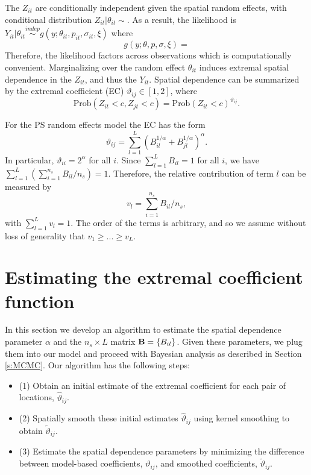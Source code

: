 \documentclass[12pt]{article}
\newcommand{\bB}{ \mbox{\bf B}}
\newcommand{\indep}{\stackrel{indep}{\sim}}
\newcommand{\beq}{ \begin{equation}}
\newcommand{\eeq}{ \end{equation}}
\begin{document}
The $Z_{it}$ are conditionally independent given the spatial random effects, with conditional distribution $Z_{it}|\theta_{it}\sim$.  As a result, the likelihood is $Y_{it}|\theta_{it} \indep g(y;\theta_{it},p_{it},\sigma_{it},\xi)$ where
\beq\label{g}
   g(y;\theta,p,\sigma,\xi)  = 
\eeq
Therefore, the likelihood factors across observations which is computationally convenient. Marginalizing over the random effect $\theta_{it}$ induces extremal spatial dependence in the $Z_{it}$, and thus the $Y_{it}$.   Spatial dependence can be summarized by the extremal coefficient (EC) $\vartheta_{ij}\in[1,2]$, where
\beq\label{ECdev}
  \mbox{Prob}(Z_{it}<c,Z_{jt}<c) = \mbox{Prob}(Z_{it}<c)^{\vartheta_{ij}}.
\eeq

For the PS random effects model the EC has the form
\beq\label{EC}
   \vartheta_{ij} = \sum_{l=1}^L \left(B_{il}^{1/\alpha}+B_{jl}^{1/\alpha}\right)^\alpha.
\eeq
In particular, $\vartheta_{ii} = 2^{\alpha}$ for all $i$.  Since $\sum_{l=1}^LB_{il}=1$ for all $i$, we have $\sum_{l=1}^L(\sum_{i=1}^{n_s}B_{il}/n_s) = 1$.  Therefore, the relative contribution of term $l$ can be measured by 
\beq 
  v_l = \sum_{i=1}^{n_s}B_{il}/n_s,
\eeq
with $\sum_{l=1}^Lv_l=1$.  The order of the terms is arbitrary, and so we assume without loss of generality that $v_1\ge...\ge v_L$.


\section{Estimating the extremal coefficient function}\label{s:estimation}

In this section we develop an algorithm to estimate the spatial dependence parameter $\alpha$ and the $n_s\times L$ matrix $\bB = \{B_{il}\}$.  Given these parameters, we plug them into our model and proceed with Bayesian analysis as described in Section \ref{s:MCMC}.  Our algorithm has the following steps:
\begin{itemize}
  \item[] (1) Obtain an initial estimate of the extremal coefficient for each pair of locations, ${\hat \vartheta}_{ij}$.
  \item[] (2) Spatially smooth these initial estimates ${\hat \vartheta}_{ij}$ using kernel smoothing to obtain ${\tilde \vartheta}_{ij}$.
  \item[] (3) Estimate the spatial dependence parameters by minimizing the difference between model-based coefficients, $\vartheta_{ij}$, and smoothed coefficients, ${\tilde \vartheta}_{ij}$.
\end{itemize}
\end{document}
